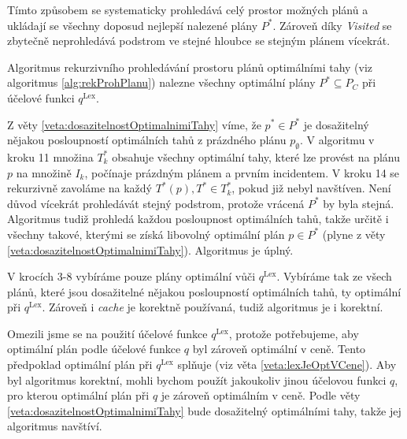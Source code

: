 Tímto způsobem se systematicky prohledává celý prostor možných plánů a ukládají se všechny doposud nejlepší nalezené plány $P^*$.
Zároveň díky \textit{Visited} se zbytečně neprohledává podstrom ve stejné hloubce se stejným plánem vícekrát.

\begin{veta}\label{}
  Algoritmus rekurzivního prohledávání prostoru plánů optimálními tahy (viz algoritmus \ref{alg:rekProhPlanu}) nalezne všechny optimální plány $P^* \subseteq P_C$ při účelové funkci $q^{\text{Lex}}$.
\end{veta}
\begin{dukaz}
  Z věty \ref{veta:dosazitelnostOptimalnimiTahy} víme, že $p^* \in P^*$ je dosažitelný nějakou posloupností optimálních tahů z prázdného plánu $p_{\emptyset}$. 
  V algoritmu v kroku 11 množina $T^*_k$ obsahuje všechny optimální tahy, které lze provést na plánu $p$ na množině $I_k$, počínaje prázdným plánem a prvním incidentem.
  V kroku 14 se rekurzivně zavoláme na každý $T^*(p), T^* \in T^*_k$, pokud již nebyl navštíven.
  Není důvod vícekrát prohledávát stejný podstrom, protože vrácená $P^*$ by byla stejná.
  Algoritmus tudiž prohledá každou posloupnost optimálních tahů, takže určitě i všechny takové, kterými se získá libovolný optimální plán $p \in P^*$ (plyne z věty \ref{veta:dosazitelnostOptimalnimiTahy}).
  Algoritmus je úplný.

  V krocích 3-8 vybíráme pouze plány optimální vůči $q^{\text{Lex}}$.
  Vybíráme tak ze všech plánů, které jsou dosažitelné nějakou posloupností optimálních tahů, ty optimální při $q^{\text{Lex}}$.
  Zároveň i \textit{cache} je korektně používaná, tudiž algoritmus je i korektní.
\end{dukaz}

Omezili jsme se na použití účelové funkce $q^{\text{Lex}}$, protože potřebujeme, aby optimální plán podle účelové funkce $q$ byl zároveň optimální v ceně.
Tento předpoklad optimální plán při $q^{\text{Lex}}$ splňuje (viz věta \ref{veta:lexJeOptVCene}).
Aby byl algoritmus korektní, mohli bychom použít jakoukoliv jinou účelovou funkci $q$, pro kterou optimální plán při $q$ je zároveň optimálním v ceně.
Podle věty \ref{veta:dosazitelnostOptimalnimiTahy} bude dosažitelný optimálními tahy, takže jej algoritmus navštíví.

